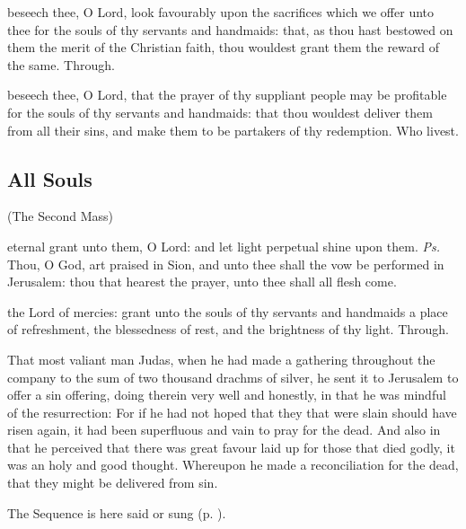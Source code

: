 \clearpage
\secret
{} beseech thee, O Lord, look favourably upon the sacrifices which we offer unto thee for the souls of thy servants and handmaids: that, as thou hast bestowed on them the merit of the Christian faith, thou wouldest grant them the reward of the same. Through.


\postcommunion
{} beseech thee, O Lord, that the prayer of thy suppliant people may be profitable for the souls of thy servants and handmaids: that thou wouldest deliver them from all their sins, and make them to be partakers of thy redemption. Who livest.


\subsection{All Souls}
\centerline{\small{(The Second Mass)}}\label{AllSoulsII}

\introit
{} eternal grant unto them, O Lord: and let light perpetual shine upon them. \textit{Ps.} Thou, O God, art praised in Sion, and unto thee shall the vow be performed in Jerusalem: thou that hearest the prayer, unto thee shall all flesh come.

\collect
{} the Lord of mercies: grant unto the souls of thy servants and handmaids a place of refreshment, the blessedness of rest, and the brightness of thy light. Through.

 That most valiant man Judas, when he had made a gathering throughout the company to the sum of two thousand drachms of silver, he sent it to Jerusalem to offer a sin offering, doing therein very well and honestly, in that he was mindful of the resurrection: For if he had not hoped that they that were slain should have risen again, it had been superfluous and vain to pray for the dead. And also in that he perceived that there was great favour laid up for those that died godly, it was an holy and good thought. Whereupon he made a reconciliation for the dead, that they might be delivered from sin.

\begin{rubric}
    The Sequence  is here said or sung (p. \pageref{diesirae}).
\end{rubric}

